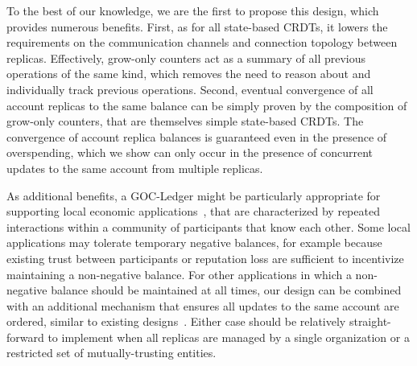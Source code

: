 \documentclass[9pt, oneside]{article}   	%
\begin{document}
To the best of our knowledge, we are the first to propose this design, which provides numerous benefits. First, as for all state-based CRDTs, it lowers the requirements on the communication channels and connection topology between replicas. Effectively, grow-only counters act as a summary of all previous operations of the same kind, which removes the need to reason about and individually track previous operations. Second, eventual convergence of all account replicas to the same balance can be simply proven by the composition of grow-only counters, that are themselves simple state-based CRDTs. The convergence of account replica balances is guaranteed even in the presence of overspending, which we show can only occur in the presence of concurrent updates to the same account from multiple replicas.


As additional benefits, a GOC-Ledger might be particularly appropriate for supporting local economic applications~\cite{lavoie2022localcryptotokens}, that are characterized by repeated interactions within a community of participants that know each other. Some local applications may tolerate temporary negative balances, for example because existing trust between participants or reputation loss are sufficient to incentivize maintaining a non-negative balance. For other applications in which a non-negative balance should be maintained at all times, our design can be combined with an additional mechanism that ensures all updates to the same account are ordered, similar to existing designs~\cite{collins2020broadcast-payment,baudet2020fastpay}. Either case should be relatively straight-forward to implement when all replicas are managed by a single organization or a restricted set of mutually-trusting entities.
\end{document}
